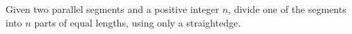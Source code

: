 Given two parallel segments and a positive integer $n$,
divide one of the segments into $n$ parts of equal lengths,
using only a straightedge.
